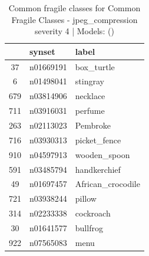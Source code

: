 \begin{table}
\caption{Common fragile classes for Common Fragile Classes - jpeg_compression severity 4 | Models: ()}
\label{tab:Common Fragile Classes - jpeg_compression severity 4_d41d8cd9}
\begin{tabular}{cll}
\toprule
 & synset & label \\
\midrule
37 & n01669191 & box_turtle \\
6 & n01498041 & stingray \\
679 & n03814906 & necklace \\
711 & n03916031 & perfume \\
263 & n02113023 & Pembroke \\
716 & n03930313 & picket_fence \\
910 & n04597913 & wooden_spoon \\
591 & n03485794 & handkerchief \\
49 & n01697457 & African_crocodile \\
721 & n03938244 & pillow \\
314 & n02233338 & cockroach \\
30 & n01641577 & bullfrog \\
922 & n07565083 & menu \\
\bottomrule
\end{tabular}
\end{table}
